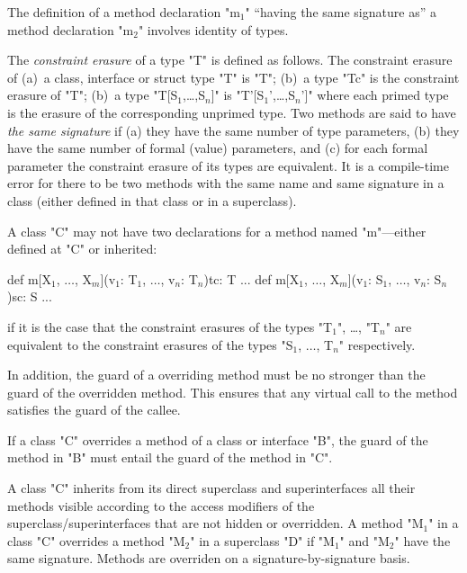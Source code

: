 The definition of a method declaration \xcdmath"m$_1$" ``having the same signature
as'' a method declaration \xcdmath"m$_2$" involves identity of types. 

The {\em constraint erasure} of a type \xcdmath"T" is defined as follows.
The constraint erasure of  (a)~a class, interface or struct type \xcdmath"T" is 
\xcdmath"T"; (b)~a type \xcdmath"T{c}" is the constraint erasure of 
\xcdmath"T"; (b)~a type \xcdmath"T[S$_1$,\ldots,S$_n$]" 
is \xcdmath"T'[S$_1$',\ldots,S$_n$']" where each primed type is the erasure of 
the corresponding unprimed type.
 Two methods are said to have {\em the
  same signature} if (a) they have the same number of type parameters,
(b) they have the same number of formal (value) parameters, and (c)
for each formal parameter the constraint erasure of its types are equivalent. It is a
compile-time error for there to be two methods with the same name and
same signature in a class (either defined in that class or in a
superclass).

\begin{staticrule*}
  A class \xcd"C" may not have two declarations for a method named \xcd"m"---either
  defined at \xcd"C" or inherited:
\begin{xtenmath}
def m[X$_1$, $\dots$, X$_m$](v$_1$: T$_1$, $\dots$, v$_n$: T$_n$){tc}: T {...}
def m[X$_1$, $\dots$, X$_m$](v$_1$: S$_1$, $\dots$, v$_n$: S$_n$){sc}: S {...}
\end{xtenmath}
\noindent
if it is the case that the constraint erasures of the types \xcdmath"T$_1$",
\dots, \xcdmath"T$_n$" are
equivalent to the constraint erasures of the types \xcdmath"S$_1$, $\dots$, T$_n$"
respectively.
\end{staticrule*}

In addition, the guard of a overriding method must be 
no stronger than the guard of the overridden method.   This
ensures that any virtual call to the method
satisfies the guard of the callee.

\begin{staticrule*}
  If a class \xcd"C" overrides a method of a class or interface
  \xcd"B", the guard of the method in \xcd"B" must entail
  the guard of the method in \xcd"C".
\end{staticrule*}

A class \xcd"C" inherits from its direct superclass and superinterfaces all
their methods visible according to the access modifiers
of the superclass/superinterfaces that are not hidden or overridden. A method \xcdmath"M$_1$" in a class
\xcd"C" overrides
a method \xcdmath"M$_2$" in a superclass \xcd"D" if
\xcdmath"M$_1$" and \xcdmath"M$_2$" have the same signature.
Methods are overriden on a signature-by-signature basis.

